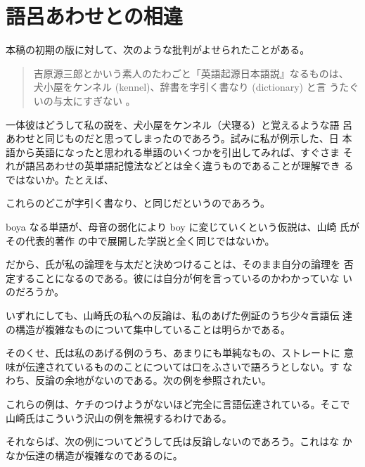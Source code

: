 ﻿\documentclass[11pt,twoside]{jreport}
\begin{document}
\chapter{語呂あわせとの相違}

本稿の初期の版に対して、次のような批判がよせられたことがある。

\begin{quote}
    吉原源三郎とかいう素人のたわごと「英語起源日本語説』なるものは、
    犬小屋をケンネル (kennel)、辞書を字引く書なり (dictionary) と言
    うたぐいの与太にすぎない \cite{山崎91a}。
\end{quote}

  一体彼はどうして私の説を、犬小屋をケンネル（犬寝る）と覚えるような語
呂あわせと同じものだと思ってしまったのであろう。試みに私が例示した、日
本語から英語になったと思われる単語のいくつかを引出してみれば、すぐさま
それが語呂あわせの英単語記憶法などとは全く違うものであることが理解でき
るではないか。たとえば、

\noindent
これらのどこが字引く書なり、と同じだというのであろう。

  boya なる単語が、母音の弱化により boy に変じていくという仮説は、山崎
氏がその代表的著作 の中で展開した学説と全く同じではないか。

  だから、氏が私の論理を与太だと決めつけることは、そのまま自分の論理を
否定することになるのである。彼には自分が何を言っているのかわかっていな
いのだろうか。

  いずれにしても、山崎氏の私への反論は、私のあげた例証のうち少々言語伝
達の構造が複雑なものについて集中していることは明らかである。

  そのくせ、氏は私のあげる例のうち、あまりにも単純なもの、ストレートに
意味が伝達されているもののことについては口をふさいで語ろうとしない。す
なわち、反論の余地がないのである。次の例を参照されたい。

\noindent
これらの例は、ケチのつけようがないほど完全に言語伝達されている。そこで
山崎氏はこういう沢山の例を無視するわけである。

  それならば、次の例についてどうして氏は反論しないのであろう。これはな
かなか伝達の構造が複雑なのであるのに。
\end{document}
